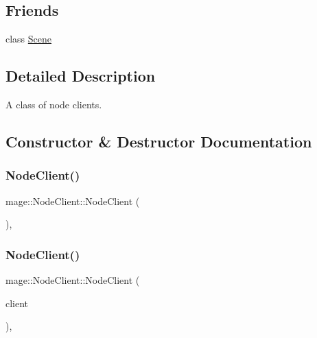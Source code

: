 \subsection*{Friends}
\begin{DoxyCompactItemize}
\item 
class \hyperlink{classmage_1_1_node_client_a032858ae1fe02d2d1170981c2af2d67c}{Scene}
\end{DoxyCompactItemize}


\subsection{Detailed Description}
A class of node clients. 

\subsection{Constructor \& Destructor Documentation}
\hypertarget{classmage_1_1_node_client_aee91ed554a09bd4a767d2b9fe004a08c}{}\label{classmage_1_1_node_client_aee91ed554a09bd4a767d2b9fe004a08c} 
\subsubsection{\texorpdfstring{Node\+Client()}{NodeClient()}\hspace{0.1cm}{\footnotesize\ttfamily [1/3]}}
{\footnotesize\ttfamily mage\+::\+Node\+Client\+::\+Node\+Client (\begin{DoxyParamCaption}{ }\end{DoxyParamCaption})\hspace{0.3cm}{\ttfamily [private]}, {\ttfamily [delete]}}

\hypertarget{classmage_1_1_node_client_a2cc014dd71cf408dd65ff95fb26d524d}{}\label{classmage_1_1_node_client_a2cc014dd71cf408dd65ff95fb26d524d} 
\subsubsection{\texorpdfstring{Node\+Client()}{NodeClient()}\hspace{0.1cm}{\footnotesize\ttfamily [2/3]}}
{\footnotesize\ttfamily mage\+::\+Node\+Client\+::\+Node\+Client (\begin{DoxyParamCaption}\item[{const \hyperlink{classmage_1_1_node_client}{Node\+Client} \&}]{client }\end{DoxyParamCaption})\hspace{0.3cm}{\ttfamily [private]}, {\ttfamily [delete]}}

